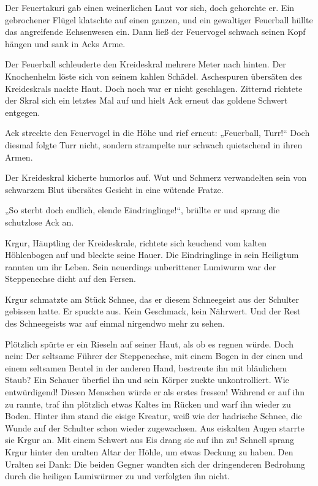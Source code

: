 Der Feuertakuri gab einen weinerlichen Laut vor sich, doch gehorchte er. Ein gebrochener Flügel klatschte auf einen ganzen, und ein gewaltiger Feuerball hüllte das angreifende Echsenwesen ein. Dann ließ der Feuervogel schwach seinen Kopf hängen und sank in Acks Arme.

Der Feuerball schleuderte den Kreideskral mehrere Meter nach hinten. Der Knochenhelm löste sich von seinem kahlen Schädel. Aschespuren übersäten des Kreideskrals nackte Haut. Doch noch war er nicht geschlagen. Zitternd richtete der Skral sich ein letztes Mal auf und hielt Ack erneut das goldene Schwert entgegen.

Ack streckte den Feuervogel in die Höhe und rief erneut: „Feuerball, Turr!“ Doch diesmal folgte Turr nicht, sondern strampelte nur schwach quietschend in ihren Armen.

Der Kreideskral kicherte humorlos auf. Wut und Schmerz verwandelten sein von schwarzem Blut übersätes Gesicht in eine wütende Fratze.

„So sterbt doch endlich, elende Eindringlinge!“, brüllte er und sprang die schutzlose Ack an.\bigskip







Krgur, Häuptling der Kreideskrale, richtete sich keuchend vom kalten Höhlenbogen auf und bleckte seine Hauer. Die Eindringlinge in sein Heiligtum rannten um ihr Leben. Sein neuerdings unberittener Lumiwurm war der Steppenechse dicht auf den Fersen.

Krgur schmatzte am Stück Schnee, das er diesem Schneegeist aus der Schulter gebissen hatte. Er spuckte aus. Kein Geschmack, kein Nährwert. Und der Rest des Schneegeists war auf einmal nirgendwo mehr zu sehen.

Plötzlich spürte er ein Rieseln auf seiner Haut, als ob es regnen würde. Doch nein: Der seltsame Führer der Steppenechse, mit einem Bogen in der einen und einem seltsamen Beutel in der anderen Hand, bestreute ihn mit bläulichem Staub? Ein Schauer überfiel ihn und sein Körper zuckte unkontrolliert. Wie entwürdigend! Diesen Menschen würde er als erstes fressen! Während er auf ihn zu rannte, traf ihn plötzlich etwas Kaltes im Rücken und warf ihn wieder zu Boden. Hinter ihm stand die eisige Kreatur, weiß wie der hadrische Schnee, die Wunde auf der Schulter schon wieder zugewachsen. Aus eiskalten Augen starrte sie Krgur an. Mit einem Schwert aus Eis drang sie auf ihn zu! Schnell sprang Krgur hinter den uralten Altar der Höhle, um etwas Deckung zu haben. Den Uralten sei Dank: Die beiden Gegner wandten sich der dringenderen Bedrohung durch die heiligen Lumiwürmer zu und verfolgten ihn nicht.

